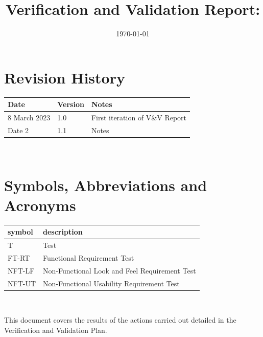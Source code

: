 \documentclass[12pt, titlepage]{article}
\begin{document}
\title{Verification and Validation Report: \progname} 
\author{\authname}
\date{\today}
	
\maketitle


\section{Revision History}

\begin{tabularx}{\textwidth}{p{3cm}p{2cm}X}
\toprule {\bf Date} & {\bf Version} & {\bf Notes}\\
\midrule
8 March 2023 & 1.0 & First iteration of V\&V Report \\
Date 2 & 1.1 & Notes\\
\bottomrule
\end{tabularx}

~\newpage

\section{Symbols, Abbreviations and Acronyms}

\renewcommand{\arraystretch}{1.2}
\begin{tabular}{l l} 
  \toprule		
  \textbf{symbol} & \textbf{description}\\
  \midrule 
  T & Test\\
  FT-RT & Functional Requirement Test \\
  NFT-LF & Non-Functional Look and Feel Requirement Test \\
  NFT-UT & Non-Functional Usability Requirement Test \\
  \bottomrule
\end{tabular}\\


\newpage

\tableofcontents

\listoftables %

\listoffigures %

\newpage


This document covers the results of the actions carried out detailed in the Verification and Validation Plan.
\end{document}
